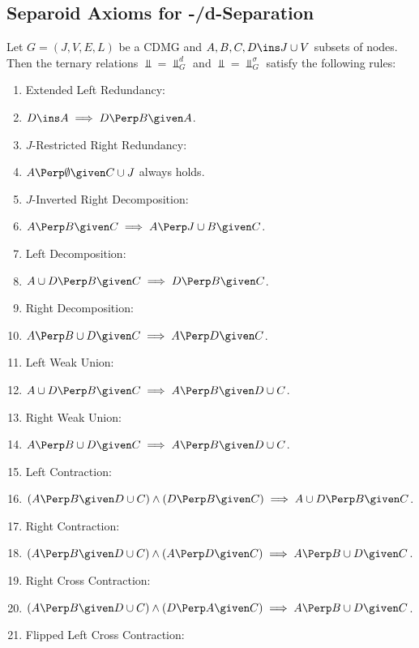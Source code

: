 \subsection{Separoid Axioms for \textsigma-/d-Separation}

\begin{DefThm}
    \label{d-sep-separoid-axioms}
    Let $G=(J,V,E,L)$ be a CDMG and $A,B,C,D \ins J \cup V$ subsets of nodes.
Then the ternary relations $\Perp = \Perp_G^d$ and $\Perp = \Perp_G^\sigma$ satisfy the following rules:
\begin{enumerate}[label=\alph*)]
    \item Extended Left Redundancy: 
    \item[] $D \ins A \implies D \Perp  B \given A$.
    \item $J$-Restricted Right Redundancy: 
    \item[] $A \Perp  \emptyset \given C \cup J$ always holds.
    \item $J$-Inverted Right Decomposition: 
    \item[] $A \Perp  B \given C \implies A \Perp  J \cup B \given C$.
	\item Left Decomposition:  
	\item[]$A \cup D \Perp  B \given C \implies D \Perp  B \given C$.
  \item Right Decomposition:  	
    \item[] $A \Perp  B \cup D\given C \implies A \Perp  D \given C$.
    \item Left Weak Union:
    \item[] $A \cup D \Perp  B  \given C \implies A \Perp  B \given D \cup C$.
  \item Right Weak Union:\item[] $A \Perp  B \cup D \given C \implies A \Perp  B \given D \cup C$.
\item Left Contraction:\item[] 
 $ (A \Perp  B \given D \cup C) \land (D \Perp  B \given C) \implies A \cup D \Perp  B \given C$.
\item Right Contraction:
\item[] $ (A \Perp  B \given D \cup C) \land (A \Perp  D \given C)  \implies A \Perp  B \cup D \given C$.
\item Right Cross Contraction:
\item[] $ (A \Perp  B \given D \cup C) \land (D \Perp  A \given C) \implies A  \Perp  B \cup D \given C$.
\item Flipped Left Cross Contraction: 

\end{enumerate}
\end{DefThm}
